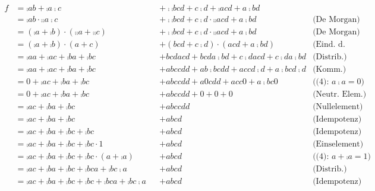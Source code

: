 \documentclass{CInf_practice}
\begin{document}
\allowdisplaybreaks
\begin{align*}
f &= \comp{ab + \comp a \comp c} &&+ \comp{ \comp{ bcd + c \comp d } + \comp{acd + a \comp b d} } &  \\
  &= \comp{ab} \cdot \comp{\comp a \comp c} &&+ \comp{ \comp{ bcd + c \comp d } } \cdot \comp{ \comp{acd + a \comp b d} } & \text{(De Morgan)} \\  
  &= \left(\comp a + \comp b \right) \cdot \left( \comp {\comp a} + \comp {\comp c} \right) &&+ \comp{ \comp{ bcd + c \comp d } } \cdot \comp{ \comp{acd + a \comp b d} } & \text{(De Morgan)} \\
  &= \left(\comp a + \comp b \right) \cdot \left( a + c \right)&&+ \left( bcd + c \comp d \right) \cdot \left( acd + a \comp b d \right) & \text{(Eind. d. Kompl.)} \\
  &= \comp a a + \comp a c + \comp b a + \comp b c &&+ bcdacd + bcda\comp b d + c\comp d acd + c\comp d a \comp b d & \text{(Distrib.)} \\
  &= \comp a a + \comp a c + \comp b a + \comp b c &&+ abccdd + ab\comp b cdd + accd\comp d + a\comp b c d\comp d & \text{(Komm.)} \\
  &= 0 + \comp a c + \comp b a + \comp b c &&+ abccdd + a 0 cdd + acc0 + a\comp b c 0 & \text{((4): $a\comp a = 0$)} \\
  &= 0 + \comp a c + \comp b a + \comp b c &&+ abccdd + 0 + 0 + 0 & \text{(Neutr. Elem.)} \\
  &= \comp a c + \comp b a + \comp b c &&+ abccdd & \text{(Nullelement)} \\
  &= \comp a c + \comp b a + \comp b c &&+ abcd & \text{(Idempotenz)} \\
  &= \comp a c + \comp b a + \comp b c + \comp b c &&+ abcd & \text{(Idempotenz)} \\
  &= \comp a c + \comp b a + \comp b c + \comp b c \cdot 1 &&+ abcd & \text{(Einselement)} \\
  &= \comp a c + \comp b a + \comp b c + \comp b c \cdot \left(a+\comp a\right) &&+ abcd & \text{((4): $a+\comp a = 1$)} \\
  &= \comp a c + \comp b a + \comp b c + \comp b c a + \comp b c \comp a && + abcd & \text{(Distrib.)} \\
  &= \comp a c + \comp b a + \comp b c + \comp b c + \comp b c a + \comp b c \comp a && + abcd & \text{(Idempotenz)} \\

\end{align*}
\end{document}
